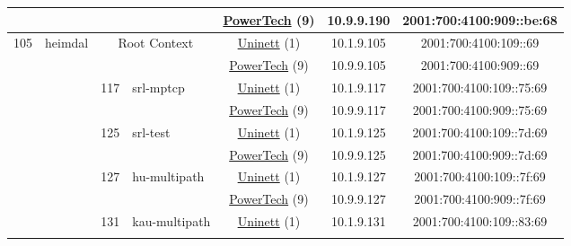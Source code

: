 \begin{small}
\begin{center}
\begin{longtable}{|c|c|c|c|c|c|c|c|}
  &  &  &  & \multicolumn{2}{|c|}{\tiny{\href{http://www.powertech.no}{PowerTech} (9)}} & \tiny{10.9.9.190} & \tiny{2001:700:4100:909::be:68} \\ \hline
 \multirow{22}{*}{\tiny{105}} & \multicolumn{1}{|l|}{\multirow{22}{*}{\tiny{heimdal}}} & \multicolumn{2}{|c|}{\multirow{2}{*}{\tiny{Root Context}}} & \multicolumn{2}{|c|}{\tiny{\href{https://www.uninett.no}{Uninett} (1)}} & \tiny{10.1.9.105} & \tiny{2001:700:4100:109::69} \\* \cline{5-5}\cline{6-6}\cline{7-7}\cline{8-8}
  &  & \multicolumn{2}{|c|}{} & \multicolumn{2}{|c|}{\tiny{\href{http://www.powertech.no}{PowerTech} (9)}} & \tiny{10.9.9.105} & \tiny{2001:700:4100:909::69} \\* \cline{3-3}\cline{4-4}\cline{5-5}\cline{6-6}\cline{7-7}\cline{8-8}
  &  & \multirow{2}{*}{\tiny{117}} & \multicolumn{1}{|l|}{\multirow{2}{*}{\tiny{srl-mptcp}}} & \multicolumn{2}{|c|}{\tiny{\href{https://www.uninett.no}{Uninett} (1)}} & \tiny{10.1.9.117} & \tiny{2001:700:4100:109::75:69} \\* \cline{5-5}\cline{6-6}\cline{7-7}\cline{8-8}
  &  &  &  & \multicolumn{2}{|c|}{\tiny{\href{http://www.powertech.no}{PowerTech} (9)}} & \tiny{10.9.9.117} & \tiny{2001:700:4100:909::75:69} \\* \cline{3-3}\cline{4-4}\cline{5-5}\cline{6-6}\cline{7-7}\cline{8-8}
  &  & \multirow{2}{*}{\tiny{125}} & \multicolumn{1}{|l|}{\multirow{2}{*}{\tiny{srl-test}}} & \multicolumn{2}{|c|}{\tiny{\href{https://www.uninett.no}{Uninett} (1)}} & \tiny{10.1.9.125} & \tiny{2001:700:4100:109::7d:69} \\* \cline{5-5}\cline{6-6}\cline{7-7}\cline{8-8}
  &  &  &  & \multicolumn{2}{|c|}{\tiny{\href{http://www.powertech.no}{PowerTech} (9)}} & \tiny{10.9.9.125} & \tiny{2001:700:4100:909::7d:69} \\* \cline{3-3}\cline{4-4}\cline{5-5}\cline{6-6}\cline{7-7}\cline{8-8}
  &  & \multirow{2}{*}{\tiny{127}} & \multicolumn{1}{|l|}{\multirow{2}{*}{\tiny{hu-multipath}}} & \multicolumn{2}{|c|}{\tiny{\href{https://www.uninett.no}{Uninett} (1)}} & \tiny{10.1.9.127} & \tiny{2001:700:4100:109::7f:69} \\* \cline{5-5}\cline{6-6}\cline{7-7}\cline{8-8}
  &  &  &  & \multicolumn{2}{|c|}{\tiny{\href{http://www.powertech.no}{PowerTech} (9)}} & \tiny{10.9.9.127} & \tiny{2001:700:4100:909::7f:69} \\* \cline{3-3}\cline{4-4}\cline{5-5}\cline{6-6}\cline{7-7}\cline{8-8}
  &  & \multirow{2}{*}{\tiny{131}} & \multicolumn{1}{|l|}{\multirow{2}{*}{\tiny{kau-multipath}}} & \multicolumn{2}{|c|}{\tiny{\href{https://www.uninett.no}{Uninett} (1)}} & \tiny{10.1.9.131} & \tiny{2001:700:4100:109::83:69} \\* \cline{5-5}\cline{6-6}\cline{7-7}\cline{8-8}

\end{longtable}
\end{center}
\end{small}
